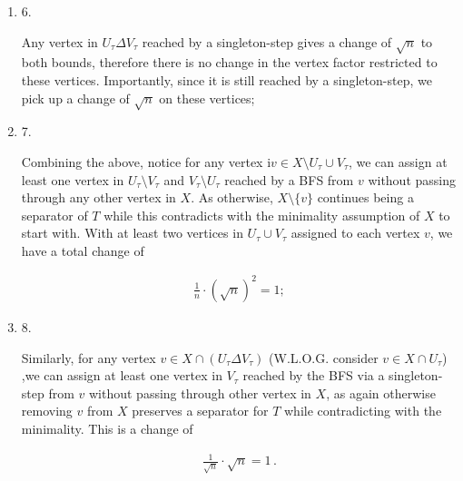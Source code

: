\documentclass[10pt,a4paper]{article}
\begin{document}
\begin{enumerate}
\[\begin{gathered}
\frac{\sqrt{n}}{n}\cdot\sqrt{n}=1\,;
\end{gathered}\]





\item[] 
6. 


Any vertex in $U_{\tau}\Delta V_{\tau}$ reached by a singleton-step gives a change of $\sqrt{n}$ to both bounds, therefore there is no change in the vertex factor restricted to these vertices. Importantly, since it is still reached by a singleton-step, we pick up a change of $\sqrt{n}$ on these vertices;\par





\item[] 
7. 


Combining the above, notice for any vertex i$v\in X\setminus U_{\tau}\cup V_{\tau}$, we can assign at least one vertex in $U_{\tau}\setminus V_{\tau}$ and $V_{\tau}\setminus U_{\tau}$ reached by a BFS from $v$ without passing through any other vertex in $X$. As otherwise, $X\setminus\{v\}$ continues being a separator of $T$ while this contradicts with the minimality assumption of $X$ to start with. With at least two vertices in $U_{\tau}\cup V_{\tau}$ assigned to each vertex $v$, we have a total change of\par


\[\begin{gathered}
\frac{1}{n}\cdot(\sqrt{n})^{2}=1;
\end{gathered}\]





\item[] 
8. 


Similarly, for any vertex $v\in X\cap(U_{\tau}\Delta V_{\tau})$ (W.L.O.G. consider $v\in X\cap U_{\tau}$) ,we can assign at least one vertex in $V_{\tau}$ reached by the BFS via a singleton-step from $v$ without passing through other vertex in $X$, as again otherwise removing $v$ from $X$ preserves a separator for $T$ while contradicting with the minimality. This is a change of\par


\[\begin{gathered}
\frac{1}{\sqrt{n}}\cdot\sqrt{n}=1\,.
\end{gathered}\]





\end{enumerate}
\end{document}
